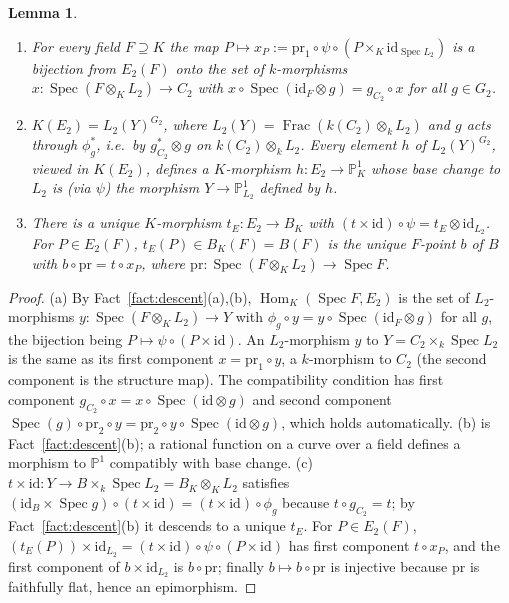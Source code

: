 \documentclass[11pt]{amsart}
\newtheorem{lemma}[theorem]{Lemma}
\theoremstyle{definition}
\theoremstyle{remark}
\newcommand{\PP}{\mathbb P}
\newcommand{\Hom}{\operatorname{Hom}}
\newcommand{\Spec}{\operatorname{Spec}}
\begin{document}
\begin{lemma}\label{lem:E2}
\begin{enumerate}[label=\textup{(\alph*)}]
\item For every field $F\supseteq K$ the map $P\mapsto x_P:=\mathrm{pr}_1\circ\psi\circ(P\times_K\mathrm{id}_{\Spec L_2})$
is a bijection from $E_2(F)$ onto the set of $k$-morphisms
$x\colon\Spec(F\otimes_KL_2)\to C_2$ with $x\circ\Spec(\mathrm{id}_F\otimes g)=g_{C_2}\circ x$ for all $g\in G_2$.
\item $K(E_2)=L_2(Y)^{G_2}$, where $L_2(Y)=\operatorname{Frac}(k(C_2)\otimes_kL_2)$ and
$g$ acts through $\phi_g^*$, i.e.\ by $g_{C_2}^*\otimes g$ on $k(C_2)\otimes_kL_2$.
Every element $h$ of $L_2(Y)^{G_2}$, viewed in $K(E_2)$, defines a $K$-morphism
$h\colon E_2\to\PP^1_K$ whose base change to $L_2$ is (via $\psi$) the morphism
$Y\to\PP^1_{L_2}$ defined by $h$.
\item There is a unique $K$-morphism $t_E\colon E_2\to B_K$ with
$(t\times\mathrm{id})\circ\psi=t_E\otimes\mathrm{id}_{L_2}$. For $P\in E_2(F)$,
$t_E(P)\in B_K(F)=B(F)$ is the unique $F$-point $b$ of $B$ with
$b\circ\mathrm{pr}=t\circ x_P$, where $\mathrm{pr}\colon\Spec(F\otimes_KL_2)\to\Spec F$.
\end{enumerate}
\end{lemma}

\begin{proof}
(a) By Fact~\ref{fact:descent}(a),(b), $\Hom_K(\Spec F,E_2)$ is the set of
$L_2$-morphisms $y\colon\Spec(F\otimes_KL_2)\to Y$ with
$\phi_g\circ y=y\circ\Spec(\mathrm{id}_F\otimes g)$ for all $g$, the bijection being
$P\mapsto\psi\circ(P\times\mathrm{id})$. An $L_2$-morphism $y$ to $Y=C_2\times_k\Spec L_2$
is the same as its first component $x=\mathrm{pr}_1\circ y$, a $k$-morphism to $C_2$
(the second component is the structure map). The compatibility condition has first
component $g_{C_2}\circ x=x\circ\Spec(\mathrm{id}\otimes g)$ and second component
$\Spec(g)\circ\mathrm{pr}_2\circ y=\mathrm{pr}_2\circ y\circ\Spec(\mathrm{id}\otimes g)$,
which holds automatically. (b) is Fact~\ref{fact:descent}(b); a rational function on a
curve over a field defines a morphism to $\PP^1$ compatibly with base change.
(c) $t\times\mathrm{id}\colon Y\to B\times_k\Spec L_2=B_K\otimes_KL_2$ satisfies
$(\mathrm{id}_B\times\Spec g)\circ(t\times\mathrm{id})=(t\times\mathrm{id})\circ\phi_g$
because $t\circ g_{C_2}=t$; by Fact~\ref{fact:descent}(b) it descends to a unique
$t_E$. For $P\in E_2(F)$, $(t_E(P))\times\mathrm{id}_{L_2}=(t\times\mathrm{id})\circ\psi\circ(P\times\mathrm{id})$
has first component $t\circ x_P$, and the first component of $b\times\mathrm{id}_{L_2}$
is $b\circ\mathrm{pr}$; finally $b\mapsto b\circ\mathrm{pr}$ is injective because
$\mathrm{pr}$ is faithfully flat, hence an epimorphism.
\end{proof}
\end{document}
